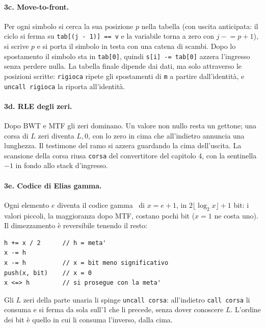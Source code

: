 \documentclass[11pt,a4paper]{article}
\newcommand{\kw}[1]{\texttt{#1}}
\begin{document}
\paragraph{3c. Move-to-front.} Per ogni simbolo si cerca la sua posizione $p$ nella tabella (con uscita anticipata: il ciclo si ferma su \kw{tab[(j - 1)] == v} e la variabile torna a zero con $j \mathrel{-}= p+1$), si scrive $p$ e si porta il simbolo in testa con una catena di scambi. Dopo lo spostamento il simbolo sta in \kw{tab[0]}, quindi \kw{s[i] -= tab[0]} azzera l'ingresso senza perdere nulla. La tabella finale dipende dai dati, ma solo attraverso le posizioni scritte: \kw{rigioca} ripete gli spostamenti di \kw{m} a partire dall'identità, e \kw{uncall rigioca} la riporta all'identità.

\paragraph{3d. RLE degli zeri.} Dopo BWT e MTF gli zeri dominano. Un valore non nullo resta un gettone; una corsa di $L$ zeri diventa $L, 0$, con lo zero in cima che all'indietro annuncia una lunghezza. Il testimone del ramo si azzera guardando la cima dell'uscita. La scansione della corsa riusa \kw{corsa} del convertitore del capitolo 4, con la sentinella $-1$ in fondo allo stack d'ingresso.

\paragraph{3e. Codice di Elias gamma.} Ogni elemento $e$ diventa il codice gamma~\cite{elias} di $x = e+1$, in $2\lfloor\log_2 x\rfloor + 1$ bit: i valori piccoli, la maggioranza dopo MTF, costano pochi bit ($x=1$ ne costa uno). Il dimezzamento è reversibile tenendo il resto:
\begin{lstlisting}
h += x / 2      // h = meta'
x -= h
x -= h          // x = bit meno significativo
push(x, bit)    // x = 0
x <=> h         // si prosegue con la meta'
\end{lstlisting}
Gli $L$ zeri della parte unaria li spinge \kw{uncall corsa}: all'indietro \kw{call corsa} li consuma e si ferma da sola sull'1 che li precede, senza dover conoscere $L$. L'ordine dei bit è quello in cui li consuma l'inverso, dalla cima.
\end{document}
